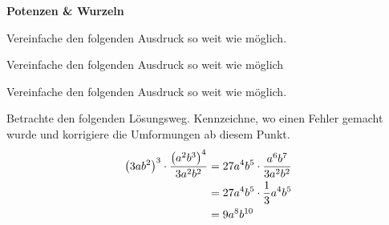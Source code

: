 \documentclass[11pt]{exam}
\newcommand{\theme}{Potenzen \& Wurzeln}
\begin{document}
\fontsize{14}{14}\selectfont
\begin{center}
    \huge\bf\theme
\end{center}

\begin{questions}
\question[4]
Vereinfache den folgenden Ausdruck so weit wie möglich.

\question[4]
Vereinfache den folgenden Ausdruck so weit wie möglich

\question[4]
Vereinfache den folgenden Ausdruck so weit wie möglich.

\question[4]
Betrachte den folgenden Lösungsweg. Kennzeichne, wo einen Fehler gemacht wurde und korrigiere die Umformungen ab diesem Punkt.
\begin{align*}
    \left(3ab^2\right)^3\cdot\frac{\left(a^2b^3\right)^4}{3a^2b^2}&=27a^4b^5\cdot\frac{a^6b^7}{3a^2b^2}\\
    &= 27a^4b^5\cdot\frac{1}{3}a^4b^5\\
    &= 9a^8b^{10}
\end{align*}


\end{questions}
\end{document}
